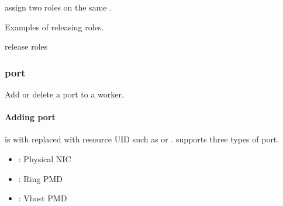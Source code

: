 \documentclass[a4paper,11pt,openany,oneside,english]{sphinxmanual}
\begin{document}
\begin{sphinxVerbatim}[commandchars=\\\{\},formatcom=\footnotesize]
 assign two roles on the same .
\end{sphinxVerbatim}

Examples of releasing roles.

\begin{sphinxVerbatim}[commandchars=\\\{\},formatcom=\footnotesize]
 release roles
\end{sphinxVerbatim}


\subsubsection{port}
\label{\detokenize{commands/secondary/spp_vf:port}}\label{\detokenize{commands/secondary/spp_vf:commands-spp-vf-port}}
Add or delete a port to a worker.


\paragraph{Adding port}
\label{\detokenize{commands/secondary/spp_vf:adding-port}}
\begin{sphinxVerbatim}[commandchars=\\\{\},formatcom=\footnotesize]
\end{sphinxVerbatim}

 is with replaced with resource UID such as  or
.  supports three types of port.
\begin{itemize}
\item {} 
 : Physical NIC

\item {} 
 : Ring PMD

\item {} 
 : Vhost PMD

\end{itemize}
\end{document}
